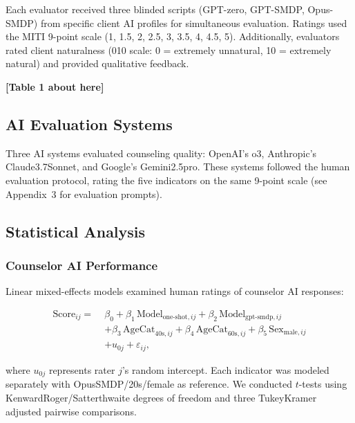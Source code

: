 \documentclass{wiley-article}
\begin{document}
Each evaluator received three blinded scripts (GPT-zero, GPT-SMDP, Opus-SMDP) from specific client AI profiles for simultaneous evaluation. Ratings used the MITI 9-point scale (1, 1.5, 2, 2.5, 3, 3.5, 4, 4.5, 5). Additionally, evaluators rated client naturalness (0\textendash{}10 scale: 0 = extremely unnatural, 10 = extremely natural) and provided qualitative feedback.

\begin{center}
\textbf{[Table 1 about here]}
\end{center}

\subsection*{AI Evaluation Systems}

Three AI systems evaluated counseling quality: OpenAI's o3, Anthropic's Claude\textendash{}3.7\textendash{}Sonnet, and Google's Gemini\textendash{}2.5\textendash{}pro. These systems followed the human evaluation protocol, rating the five indicators on the same 9-point scale (see Appendix~3 for evaluation prompts).

\subsection*{Statistical Analysis}

\subsubsection*{Counselor AI Performance}

Linear mixed-effects models examined human ratings of counselor AI responses:

\begin{equation}
\begin{aligned}
\mathrm{Score}_{ij} =\;& 
\beta_{0}
+ \beta_{1}\,\mathrm{Model}_{\text{one-shot},ij}
+ \beta_{2}\,\mathrm{Model}_{\text{gpt-smdp},ij} \\
& + \beta_{3}\,\mathrm{AgeCat}_{40\text{s},ij}
+ \beta_{4}\,\mathrm{AgeCat}_{60\text{s},ij}
+ \beta_{5}\,\mathrm{Sex}_{\text{male},ij} \\
& + u_{0j}
+ \varepsilon_{ij},
\end{aligned}
\end{equation}

where $u_{0j}$ represents rater $j$'s random intercept. Each indicator was modeled separately with Opus\textendash{}SMDP/20s/female as reference. We conducted $t$-tests using Kenward\textendash{}Roger/Satterthwaite degrees of freedom and three Tukey\textendash{}Kramer adjusted pairwise comparisons.
\end{document}
